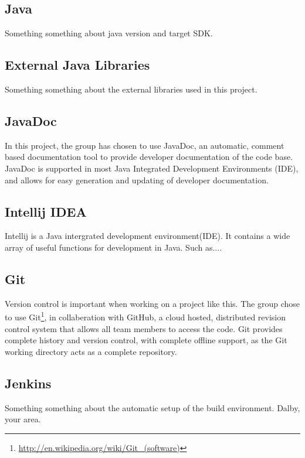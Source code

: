 \subsection{Java}

Something something about java version and target SDK.

\subsection{External Java Libraries}

Something something about the external libraries used in this project.

\subsection{JavaDoc}

In this project, the group has chosen to use JavaDoc, an automatic, comment based documentation tool to provide developer documentation of the code base. JavaDoc is supported in most Java Integrated Development Environments (IDE), and allows for easy generation and updating of developer documentation.

\subsection{Intellij IDEA}

Intellij is a Java intergrated development environment(IDE). It contains a wide array of useful functions for development in Java. Such as....

\subsection{Git}

Version control is important when working on a project like this. The group chose to use Git\footnote{\url{http://en.wikipedia.org/wiki/Git_(software)}}, in collaberation with GitHub, a cloud hosted, distributed revision control system that allows all team members to access the code. Git provides complete history and version control, with complete offline support, as the Git working directory acts as a complete repository.

\subsection{Jenkins}

Something something about the automatic setup of the build environment. Dalby, your area.

